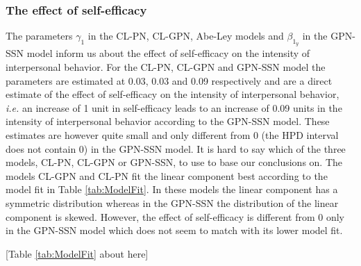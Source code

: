 \documentclass[man,mask]{apa6}
\begin{document}
\subsubsection{The effect of self-efficacy}

The parameters \(\gamma_1\) in the CL-PN, CL-GPN, Abe-Ley models and \(\beta_{1_y}\)
in the GPN-SSN model inform us about the effect of self-efficacy on the intensity
of interpersonal behavior. For the CL-PN, CL-GPN and GPN-SSN model the
parameters are estimated at 0.03, 0.03 and 0.09 respectively and are a direct
estimate of the effect of self-efficacy on the intensity of interpersonal
behavior, \emph{i.e.} an increase of 1 unit in self-efficacy leads to an
increase of 0.09 units in the intensity of interpersonal behavior according to
the GPN-SSN model. These estimates are however quite small and only different
from 0 (the HPD interval does not contain 0) in the GPN-SSN model. It is hard to
say which of the three models, CL-PN, CL-GPN or GPN-SSN, to use to base our
conclusions on. The models CL-GPN and CL-PN fit the linear component best according
to the model fit in Table \ref{tab:ModelFit}. In these models the linear component has a
symmetric distribution whereas in the GPN-SSN the distribution of the linear
component is skewed. However, the effect of self-efficacy is different from 0 only
in the GPN-SSN model which does not seem to match with its lower model fit.

\hfil \hspace{2cm} {[}Table \ref{tab:ModelFit} about here{]} \hfil
\end{document}
